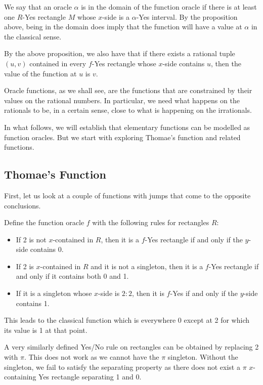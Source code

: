 \documentclass[12pt]{article}
\theoremstyle{remark}
\begin{document}
We say that an oracle $\alpha$ is in the domain of the function oracle if there is at least one $R$-Yes rectangle $M$ whose $x$-side is a $\alpha$-Yes interval. By the proposition above, being in the domain does imply that the function will have a value at $\alpha$ in the classical sense. 

By the above proposition, we also have that if there exists a rational tuple $(u,v)$ contained in every $f$-Yes rectangle whose $x$-side contains $u$, then the value of the function at $u$ is $v$.


Oracle functions, as we shall see, are the functions that are constrained by their values on the rational numbers. In particular, we need what happens on the rationals to be, in a certain sense, close to what is happening on the irrationals. 

In what follows, we will establish that elementary functions can be modelled as function oracles. But we start with exploring Thomae's function and related functions.


\subsection{Thomae's Function}

First, let us look at a couple of functions with jumps that come to the opposite conclusions. 

Define the function oracle $f$ with the following rules for rectangles $R$: 

\begin{itemize}
    \item If 2 is not $x$-contained in $R$, then it is a $f$-Yes rectangle if and only if the $y$-side contains 0. 
    \item If 2 is $x$-contained in $R$ and it is not a singleton, then it is a $f$-Yes rectangle if and only if it contains both 0 and 1.
    \item If it is a singleton whose $x$-side is $2:2$, then it is $f$-Yes if and only if the $y$-side contains 1. 
\end{itemize}

This leads to the classical function which is everywhere 0 except at 2 for which its value is 1 at that point. 

A very similarly defined Yes/No rule on rectangles can be obtained by replacing 2 with $\pi$. This does not work as we cannot have the $\pi$ singleton. Without the singleton, we fail to satisfy the separating property as there does not exist a $\pi$ $x$-containing Yes rectangle separating 1 and 0.  
\end{document}
